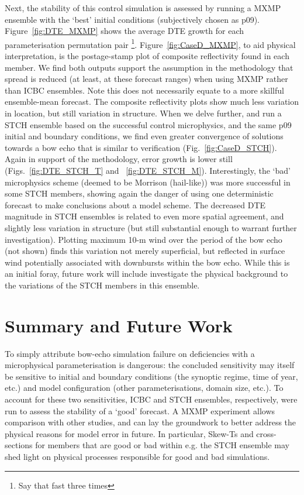 \documentclass{ametsoc}
\begin{document}
{Next, the stability of this control simulation is assessed by running a MXMP ensemble with the `best' initial conditions (subjectively chosen as p09). Figure~\ref{fig:DTE_MXMP} shows the average DTE growth for each parameterisation permutation pair \footnote{Say that fast three times}. Figure~\ref{fig:CaseD_MXMP}, to aid physical interpretation, is the postage-stamp plot of composite reflectivity found in each member. We find both outputs support the assumption in the methodology that spread is reduced (at least, at these forecast ranges) when using MXMP rather than ICBC ensembles. Note this does not necessarily equate to a more skillful ensemble-mean forecast. The composite reflectivity plots show much less variation in location, but still variation in structure. When we delve further, and run a STCH ensemble based on the successful control microphysics, and the same p09 initial and boundary conditions, we find even greater convergence of solutions towards a bow echo that is similar to verification (Fig.~\ref{fig:CaseD_STCH}). Again in support of the methodology, error growth is lower still (Figs.~\ref{fig:DTE_STCH_T} and ~\ref{fig:DTE_STCH_M}). Interestingly, the `bad' microphysics scheme (deemed to be Morrison (hail-like)) was more successful in some STCH members, showing again the danger of using one deterministic forecast to make conclusions about a model scheme. The decreased DTE magnitude in STCH ensembles is related to even more spatial agreement, and slightly less variation in structure (but still substantial enough to warrant further investigation). Plotting maximum 10-m wind over the period of the bow echo (not shown) finds this variation not merely superficial, but reflected in surface wind potentially associated with downbursts within the bow echo. While this is an initial foray, future work will include investigate the physical background to the variations of the STCH members in this ensemble.

\section{Summary and Future Work}  \label{sec:futurework}
To simply attribute bow-echo simulation failure on deficiencies with a microphysical parameterisation is dangerous: the concluded sensitivity may itself be sensitive to initial and boundary conditions (the synoptic regime, time of year, etc.) and model configuration (other parameterisations, domain size, etc.). To account for these two sensitivities, ICBC and STCH ensembles, respectively, were run to assess the stability of a `good' forecast. A MXMP experiment allows comparison with other studies, and can lay the groundwork to better address the physical reasons for model error in future. In particular, Skew-Ts and cross-sections for members that are good or bad within e.g. the STCH ensemble may shed light on physical processes responsible for good and bad simulations.

}
\end{document}
